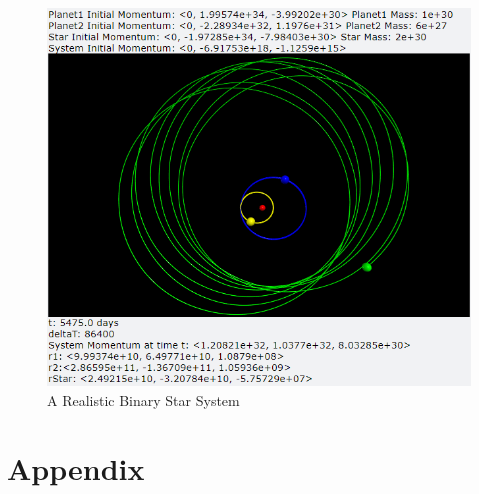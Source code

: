 \documentclass[12pt]{article}
\begin{document}
\begin{enumerate}
\begin{figure}[H]
\begin{center}
               \includegraphics[scale=.5]{ThreeBody4.png}
               \caption{A Realistic Binary Star System}
               \label{fig:ThreeBody4}
            \end{center}
        \end{figure}

    \end{enumerate}

    \newpage
    \section{Appendix}
    \setcounter{figure}{0} \renewcommand{\thefigure}{A.\arabic{figure}}
    
    
    
\end{document}
